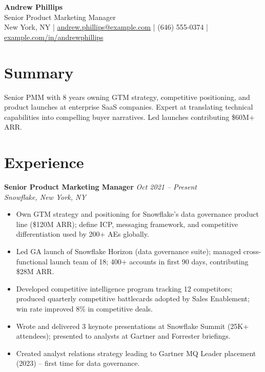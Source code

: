 \documentclass[11pt,a4paper]{article}
\begin{document}
\begin{center}
  {\LARGE \textbf{Andrew Phillips}}\\[3pt]
  {\large \textcolor{accent}{Senior Product Marketing Manager}}\\[4pt]
  New York, NY \quad|\quad
  \href{mailto:andrew.phillips@example.com}{andrew.phillips@example.com} \quad|\quad
  (646) 555-0374 \quad|\quad
  \href{https://example.com/in/andrewphillips}{example.com/in/andrewphillips}
\end{center}

\section{Summary}
Senior PMM with 8 years owning GTM strategy, competitive positioning, and product launches at enterprise SaaS companies. Expert at translating technical capabilities into compelling buyer narratives. Led launches contributing \$60M+ ARR.

\section{Experience}

\noindent\textbf{Senior Product Marketing Manager} \hfill \textit{Oct 2021 -- Present}\\
\textit{Snowflake, New York, NY}
\begin{itemize}
  \item Own GTM strategy and positioning for Snowflake's data governance product line (\$120M ARR); define ICP, messaging framework, and competitive differentiation used by 200+ AEs globally.
  \item Led GA launch of Snowflake Horizon (data governance suite); managed cross-functional launch team of 18; 400+ accounts in first 90 days, contributing \$28M ARR.
  \item Developed competitive intelligence program tracking 12 competitors; produced quarterly competitive battlecards adopted by Sales Enablement; win rate improved 8\% in competitive deals.
  \item Wrote and delivered 3 keynote presentations at Snowflake Summit (25K+ attendees); presented to analysts at Gartner and Forrester briefings.
  \item Created analyst relations strategy leading to Gartner MQ Leader placement (2023) -- first time for data governance.
\end{itemize}
\end{document}

